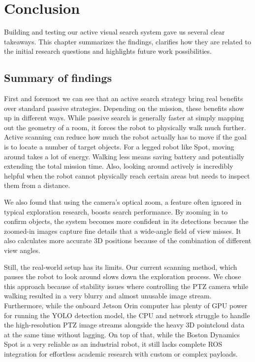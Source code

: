 \documentclass[
	parspace, %
	noindent, %
	final, %
]{elteikthesis}
\begin{document}
\chapter{Conclusion}
\label{ch:conclusion}

Building and testing our active visual search system gave us several clear takeaways. This chapter summarizes the findings, clarifies how they are related to the initial research questions and highlights future work possibilities.

\section{Summary of findings}
First and foremost we can see that an active search strategy bring real benefits over standard passive strategies. Depending on the mission, these benefits show up in different ways. While passive search is generally faster at simply mapping out the geometry of a room, it forces the robot to physically walk much further. Active scanning can reduce how much the robot actually has to move if the goal is to locate a number of target objects. For a legged robot like Spot, moving around takes a lot of energy. Walking less means saving battery and potentially extending the total mission time. Also, looking around actively is incredibly helpful when the robot cannot physically reach certain areas but needs to inspect them from a distance.

We also found that using the camera's optical zoom, a feature often ignored in typical exploration research, boosts search performance. By zooming in to confirm objects, the system becomes more confident in its detections because the zoomed-in images capture fine details that a wide-angle field of view misses. It also calculates more accurate 3D positions because of the combination of different view angles.

Still, the real-world setup has its limits. Our current scanning method, which pauses the robot to look around slows down the exploration process. We chose this approach because of stability issues where controlling the PTZ camera while walking resulted in a very blurry and almost unusable image stream.
Furthermore, while the onboard Jetson Orin computer has plenty of GPU power for running the YOLO detection model, the CPU and network struggle to handle the high-resolution PTZ image streams alongside the heavy 3D pointcloud data at the same time without lagging. On top of that, while the Boston Dynamics Spot is a very reliable as an industrial robot, it still lacks complete ROS integration for effortless academic research with custom or complex payloads. 
\end{document}
